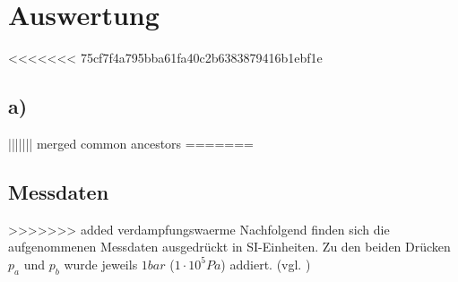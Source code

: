 \section{Auswertung}
\label{sec:Auswertung}
<<<<<<< 75cf7f4a795bba61fa40c2b6383879416b1ebf1e

\subsection{a)}
||||||| merged common ancestors
=======
\subsection{Messdaten}
\label{sec:messdaten}
>>>>>>>  added verdampfungswaerme
Nachfolgend finden sich die aufgenommenen Messdaten ausgedrückt in SI-Einheiten. Zu den beiden Drücken $p_a$ und $p_b$ wurde jeweils $1 bar$ ($1\cdot10^5 Pa$) addiert. (vgl. \cite{Anleitung})
